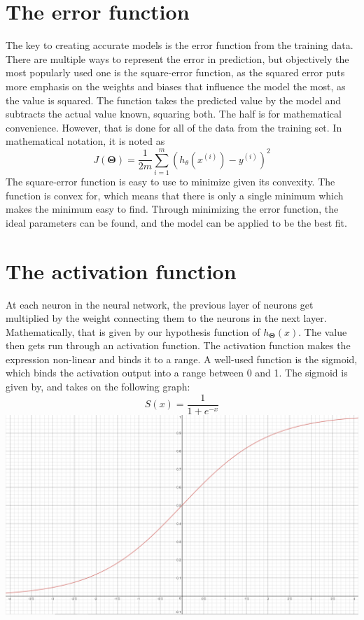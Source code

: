 \documentclass[a4paper,12pt]{article}
\begin{document}
\section{The error function}
The key to creating accurate models is the error function from the training data. There are multiple ways to represent the error in prediction, but objectively the most popularly used one is the square-error function, as the squared error puts more emphasis on the weights and biases that influence the model the most, as the value is squared. The function takes the predicted value by the model and subtracts the actual value known, squaring both. The half is for mathematical convenience. However, that is done for all of the data from the training set. In mathematical notation, it is noted as
\[J(\boldsymbol{\Theta}) = \frac{1}{2m} \sum_{i=1}^m (h_\theta(x^{(i)}) - y^{(i)})^2\]
The square-error function is easy to use to minimize given its convexity. The function is convex for, which means that there is only a single minimum which makes the minimum easy to find. Through minimizing the error function, the ideal parameters can be found, and the model can be applied to be the best fit.

\section{The activation function}
At each neuron in the neural network, the previous layer of neurons get multiplied by the weight connecting them to the neurons in the next layer. Mathematically, that is given by our hypothesis function of $h_{\boldsymbol{\Theta}}(x)$. The value then gets run through an activation function. The activation function makes the expression non-linear and binds it to a range. A well-used function is the sigmoid, which binds the activation output into a range between 0 and 1. The sigmoid is given by, and takes on the following graph:
\[S(x) = \frac{1}{1+e^{-x}}\]
\includegraphics[scale=0.25]{sigmoid}
\end{document}
